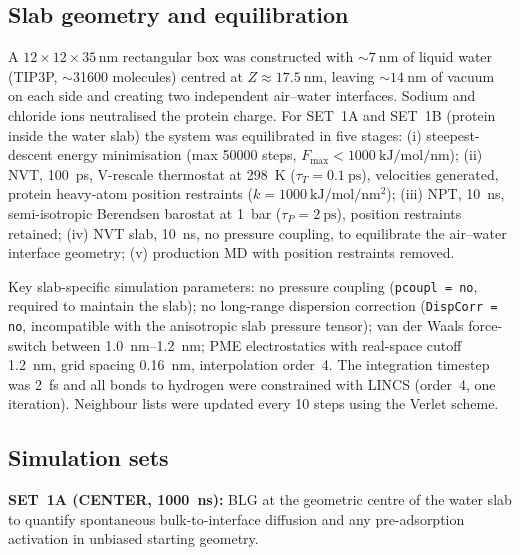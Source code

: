 \documentclass[11pt,a4paper]{article}
\begin{document}
\subsection*{Slab geometry and equilibration}

A $12\times12\times35$\,\si{\nano\metre} rectangular box was constructed with
$\sim\SI{7}{\nano\metre}$ of liquid water (TIP3P, $\sim$\num{31600}
molecules) centred at $Z \approx \SI{17.5}{\nano\metre}$, leaving
$\sim\SI{14}{\nano\metre}$ of vacuum on each side and creating two
independent air--water interfaces. Sodium and chloride ions neutralised
the protein charge. For SET~1A and SET~1B (protein inside the water slab) the system was
equilibrated in five stages: (i) steepest-descent energy minimisation
(max \num{50000} steps,
$F_\mathrm{max} < \SI{1000}{\kilo\joule\per\mole\per\nano\metre}$);
(ii) NVT, \SI{100}{\pico\second}, V-rescale thermostat\citep{Bussi2007}
at \SI{298}{\kelvin} ($\tau_T = \SI{0.1}{\pico\second}$), velocities
generated, protein heavy-atom position restraints
($k = \SI{1000}{\kilo\joule\per\mole\per\nano\metre\squared}$);
(iii) NPT, \SI{10}{\nano\second}, semi-isotropic Berendsen
barostat\citep{Berendsen1984} at \SI{1}{\bar} ($\tau_P = \SI{2}{\pico\second}$),
position restraints retained;
(iv) NVT slab, \SI{10}{\nano\second}, no pressure coupling, to equilibrate
the air--water interface geometry;
(v) production MD with position restraints removed.

Key slab-specific simulation parameters: no pressure coupling
(\texttt{pcoupl = no}, required to maintain the slab); no long-range
dispersion correction (\texttt{DispCorr = no}, incompatible with the
anisotropic slab pressure tensor); van der Waals force-switch between
\SIrange{1.0}{1.2}{\nano\metre}; PME electrostatics\citep{Essmann1995} with real-space
cutoff \SI{1.2}{\nano\metre}, grid spacing \SI{0.16}{\nano\metre},
interpolation order~4. The integration timestep was \SI{2}{\femto\second}
and all bonds to hydrogen were constrained with LINCS\citep{Hess1997}
(order~4, one iteration). Neighbour lists were updated every \num{10} steps
using the Verlet scheme.

\subsection*{Simulation sets}

\textbf{SET~1A (CENTER, \SI{1000}{\nano\second}):} BLG at the geometric
centre of the water slab to quantify spontaneous bulk-to-interface
diffusion and any pre-adsorption activation in unbiased starting geometry.
\end{document}
